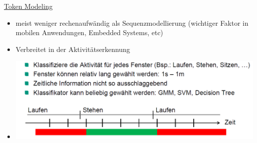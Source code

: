 \documentclass[a4paper,10pt,oneside]{article}
\begin{document}
\underline{Token Modeling} \\
 	\begin{itemize}
 		\item meist weniger rechenaufwändig als Sequenzmodellierung (wichtiger Faktor in mobilen Anwendungen, Embedded Systems, etc)
 		\item Verbreitet in der Aktivitätserkennung
 		\item[] \includegraphics[scale=0.2]{Grafiken/2333.png}
 	\end{itemize}
\end{document}
